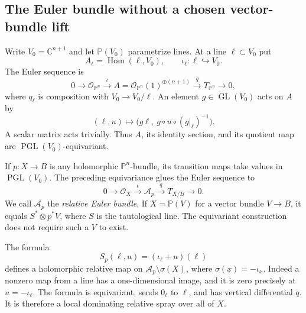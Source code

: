 \documentclass[12pt]{amsart}
\theoremstyle{definition}
\theoremstyle{remark}
\numberwithin{equation}{section}
\newcommand{\GL}{\operatorname{GL}}
\DeclareMathOperator{\Homop}{Hom}
\newcommand{\cA}{\mathcal{A}}
\newcommand{\cO}{\mathcal{O}}
\newcommand{\C}{\mathbb{C}}
\newcommand{\mP}{\mathbb{P}}
\DeclareMathOperator{\PG}{PGL}
\begin{document}
\subsection{The Euler bundle without a chosen vector-bundle lift}\label{en:eulerconstruction}
Write $V_0=\C^{n+1}$ and let $\mP(V_0)$ parametrize lines. At a line $\ell\subset V_0$ put
\[
A_\ell=\Homop(\ell,V_0),\qquad
\iota_\ell:\ell\hookrightarrow V_0.
\]
The Euler sequence is
\begin{equation}\label{en:euler}
0\longrightarrow\cO_{\mP^n}\xrightarrow{\iota}
A=\cO_{\mP^n}(1)^{\oplus(n+1)}
\xrightarrow{q}T_{\mP^n}\longrightarrow0,
\end{equation}
where $q_\ell$ is composition with $V_0\to V_0/\ell$.
An element $g\in\GL(V_0)$ acts on $A$ by
\[
(\ell,u)\longmapsto\bigl(g\ell,\ g\circ u\circ(g|_\ell)^{-1}\bigr).
\]
A scalar matrix acts trivially. Thus $A$, its identity section, and its quotient map are $\PG(V_0)$-equivariant.

If $p:X\to B$ is any holomorphic $\mP^n$-bundle, its transition maps take values in $\PG(V_0)$. The preceding equivariance glues the Euler sequence to
\begin{equation}\label{en:relativeeuler}
0\longrightarrow\cO_X\xrightarrow{\iota}\cA_p
\xrightarrow{q}T_{X/B}\longrightarrow0.
\end{equation}
We call $\cA_p$ the \emph{relative Euler bundle}. If $X=\mP(V)$ for a vector bundle $V\to B$, it equals $S^*\otimes p^*V$, where $S$ is the tautological line. The equivariant construction does not require such a $V$ to exist.

The formula
\begin{equation}\label{en:canonical}
S_p(\ell,u)=(\iota_\ell+u)(\ell)
\end{equation}
defines a holomorphic relative map on $\cA_p\setminus\sigma(X)$, where
$\sigma(x)=-\iota_x$. Indeed a nonzero map from a line has a one-dimensional image, and it is zero precisely at $u=-\iota_\ell$. The formula is equivariant, sends $0_\ell$ to $\ell$, and has vertical differential $q$. It is therefore a local dominating relative spray over all of $X$.
\end{document}
